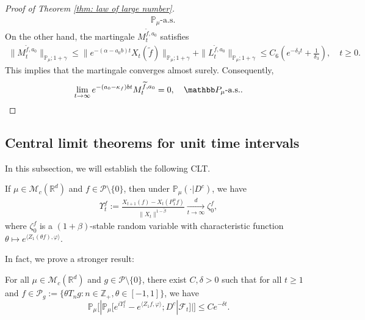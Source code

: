 \documentclass[EJP]{ejpecp} %
\begin{document}
\begin{proof}[Proof of Theorem \ref{thm: law of large number}]
\begin{align}
    \quad \mathbb P_\mu\text{-a.s.}
  \end{align}
  On the other hand, the martingale $M_t^{\widetilde{f},a_0}$ satisfies
  \begin{align}
    \|M_t^{\widetilde{f},a_0}\|_{\mathbb{P}_{\mu};1+\gamma}
    \leq \|e^{-(\alpha-a_0 b)t}X_t(\widetilde{f})\|_{\mathbb{P}_{\mu};1+\gamma}+\|L_t^{\widetilde{f},a_0}\|_{\mathbb{P}_{\mu};1+\gamma}
    \leq C_6(e^{-\delta_3 t}+\frac{1}{\delta_3}),
    \quad t\geq 0.
  \end{align}
  This implies that the martingale converges almost surely.
  Consequently,
  \[
    \lim_{t\rightarrow\infty} e^{-(a_0-\kappa_f)bt}M_t^{\widetilde{f},a_0}
    = 0,
    \quad \mathbb P_\mu\text{-a.s.}.
    \qedhere
  \]
\end{proof}

\subsection{Central limit theorems for unit time intervals}
\label{sec:critical}
In this subsection, we will establish the following CLT.
\begin{theorem}
  \label{lem:PR:LC}
If  $\mu \in \mathcal M_c(\mathbb R^d)$ and $f\in \mathcal{P}\setminus \{0\}$,
then  under $\mathbb{P}_{\mu}(\cdot | D ^c)$, we have
  \begin{align}
    \label{eq:PR:LC:1}
    \Upsilon^f_t
    := \frac{X_{t+1} (f) - X_t(P_1^\alpha f)}{\| X_t\|^{1-\tilde \beta}}
    \xrightarrow[t\to \infty]{d}\zeta^f_0,
  \end{align}
  where $\zeta^f_0$ is a $(1+\beta)$-stable random variable with characteristic function $\theta\mapsto e^{\langle Z_1(\theta f), \varphi\rangle}$.
\end{theorem}

In fact, we prove a stronger result:

\begin{proposition}
  \label{thm:Key}
  For all $\mu \in \mathcal M_c(\mathbb R^d)$ and $g \in \mathcal P \setminus \{0\}$, there exist $C,\delta>0$ such that
  for all $t\geq 1$ and $f \in \mathcal P_g:= \{\theta T_ng:n \in \mathbb Z_+, \theta \in [-1,1]\}$, we have
  \[
    \mathbb P_\mu
    \Big[  |\mathbb P_\mu [e^{i\Upsilon^f_t} - e^{\langle Z_1f, \varphi\rangle}; D^c | \mathscr F_t ]  |\Big]
    \leq C e^{- \delta t}.
  \]
\end{proposition}
\end{document}
